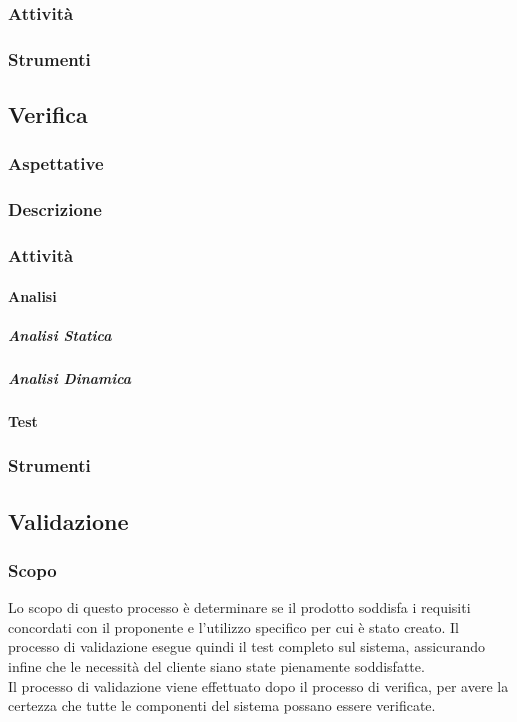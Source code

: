 \documentclass[../norme-di-progetto.tex]{subfiles}
\begin{document}
\subsubsection{Attività}
\subsubsection{Strumenti}

\subsection{Verifica}
\subsubsection{Aspettative}
\subsubsection{Descrizione}
\subsubsection{Attività}
\paragraph{Analisi}
\subparagraph{Analisi Statica}
\subparagraph{Analisi Dinamica}

\paragraph{Test} %
\subsubsection{Strumenti}

\subsection{Validazione}
\subsubsection{Scopo}
Lo scopo di questo processo è determinare se il prodotto soddisfa i requisiti concordati con il proponente e l'utilizzo specifico per cui è stato creato. Il processo di validazione esegue quindi il test completo sul sistema, assicurando infine che le necessità del cliente siano state pienamente soddisfatte. \\ Il processo di validazione viene effettuato dopo il processo di verifica, per avere la certezza che tutte le componenti del sistema possano essere verificate.
\end{document}
